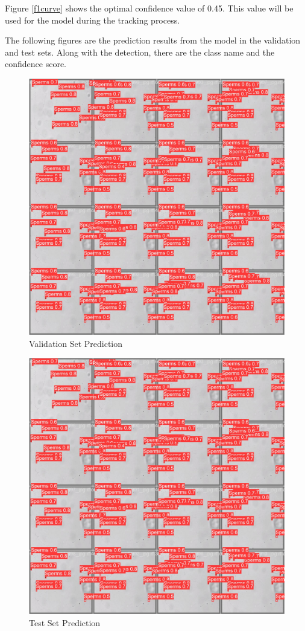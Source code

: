 Figure \ref{f1curve} shows the optimal confidence value of 0.45. This value will be used for the model during the tracking process.

The following figures are the prediction results from the model in the validation and test sets. Along with the detection, there are the class name and the confidence score. 

\begin{figure}
    \centering
    \includegraphics[width=\textwidth]{Images/val_batch0_pred.jpg}
    \caption{Validation Set Prediction}
    \label{valpred}
\end{figure}

\begin{figure}
    \centering
    \includegraphics[width=\textwidth]{Images/val_batch0_pred (1).jpg}
    \caption{Test Set Prediction}
    \label{testpred}
\end{figure}
\newpage

